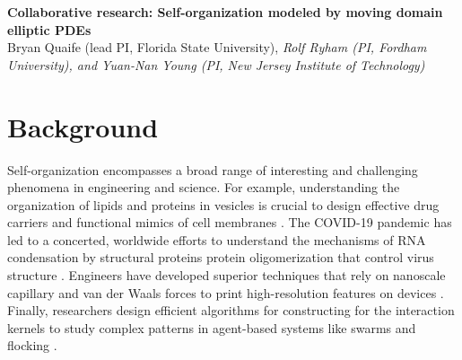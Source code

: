 \noindent
{\bf Collaborative research: Self-organization modeled by moving domain
elliptic PDEs} \\
{Bryan Quaife (lead PI, Florida State University), \em Rolf Ryham (PI,
Fordham University), and Yuan-Nan Young (PI, New Jersey Institute of
Technology)}

\section{Background}
\label{sec:background}

Self-organization encompasses a broad range of
interesting and challenging phenomena in engineering and science.
For example, understanding the
organization of lipids and proteins in vesicles is crucial to design
effective drug carriers
and functional mimics of cell membranes
\cite{Marui2022IncreasedEO,https://doi.org/10.1002/adma.202206288}.
The COVID-19 pandemic has led to a
concerted, worldwide efforts to understand
the mechanisms of RNA condensation by structural proteins protein
oligomerization that control virus structure
\cite{Kim2021SelfassembledMV}.
Engineers have developed superior techniques
that rely on nanoscale  
capillary and van der Waals forces
to print high-resolution
features on devices \cite{Zeng20223DprintedMT}.
Finally, researchers design efficient algorithms for
constructing for the interaction kernels to study complex
patterns in agent-based systems like swarms and flocking
\cite{Lu2019NonparametricIO,Tadmor2021OnTM}.


